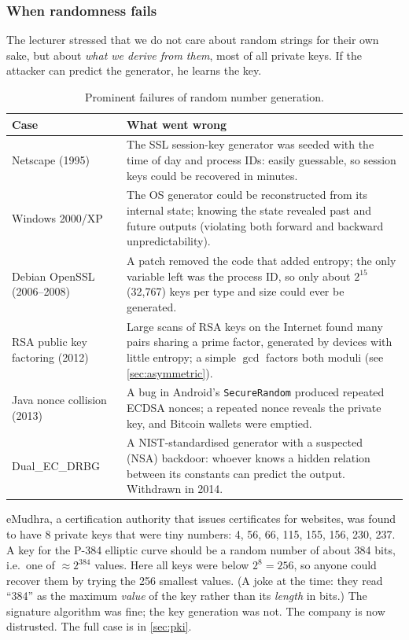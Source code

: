 \subsubsection{When randomness fails}

The lecturer stressed that we do not care about random strings for their own sake, but about \emph{what we derive from them}, most of all private keys. If the attacker can predict the generator, he learns the key.

\begin{table}[H]
\centering
\caption{Prominent failures of random number generation.}
\label{tab:rng-failures}
\begin{tabularx}{\textwidth}{@{}l X@{}}
\toprule
Case & What went wrong \\
\midrule
Netscape (1995) & The SSL session-key generator was seeded with the time of day and process IDs: easily guessable, so session keys could be recovered in minutes. \\
Windows 2000/XP & The OS generator could be reconstructed from its internal state; knowing the state revealed past and future outputs (violating both forward and backward unpredictability). \\
Debian OpenSSL (2006--2008) & A patch removed the code that added entropy; the only variable left was the process ID, so only about $2^{15}$ (32{,}767) keys per type and size could ever be generated. \\
RSA public key factoring (2012) & Large scans of RSA keys on the Internet found many pairs sharing a prime factor, generated by devices with little entropy; a simple $\gcd$ factors both moduli (see \cref{sec:asymmetric}). \\
Java nonce collision (2013) & A bug in Android's \texttt{SecureRandom} produced repeated ECDSA nonces; a repeated nonce reveals the private key, and Bitcoin wallets were emptied. \\
Dual\_EC\_DRBG & A NIST-standardised generator with a suspected (NSA) backdoor: whoever knows a hidden relation between its constants can predict the output. Withdrawn in 2014. \\
\bottomrule
\end{tabularx}
\end{table}

\begin{example}
eMudhra, a certification authority that issues certificates for websites, was found to have 8 private keys that were tiny numbers: 4, 56, 66, 115, 155, 156, 230, 237. A key for the P-384 elliptic curve should be a random number of about 384 bits, i.e.\ one of $\approx 2^{384}$ values. Here all keys were below $2^8 = 256$, so anyone could recover them by trying the 256 smallest values. (A joke at the time: they read \enquote{384} as the maximum \emph{value} of the key rather than its \emph{length} in bits.) The signature algorithm was fine; the key generation was not. The company is now distrusted. The full case is in \cref{sec:pki}.
\end{example}

